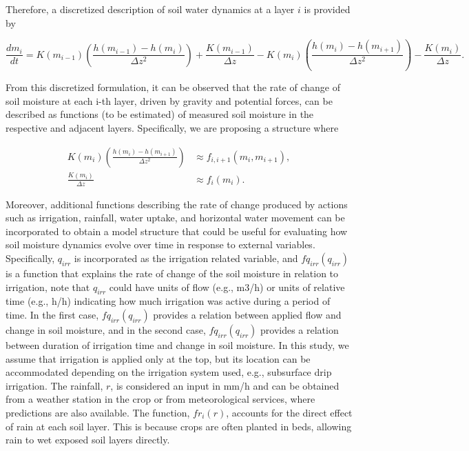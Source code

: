 \documentclass[pdflatex,sn-nature]{sn-jnl}%
\theoremstyle{thmstyleone}%
\theoremstyle{thmstyletwo}%
\theoremstyle{thmstylethree}%
\begin{document}
Therefore, a discretized description of soil water dynamics at a layer $i$ is provided by

\begin{equation}
\frac{d m_i}{d t} = K(m_{i-1})\left(\frac{h(m_{i-1})-h(m_{i})}{\Delta z^2}\right) + \frac{K(m_{i-1})}{\Delta z} - K(m_{i})\left(\frac{h(m_{i})-h(m_{i+1})}{\Delta z^2}\right) - \frac{K(m_{i})}{\Delta z}.
\end{equation}


From this discretized formulation, it can be observed that the rate of change of soil moisture at each i-th layer, driven by gravity and potential forces, can be described as functions (to be estimated) of measured soil moisture in the respective and adjacent layers. Specifically, we are proposing a structure where

\begin{equation}
\begin{aligned}
K(m_{i})\left(\frac{h(m_{i})-h(m_{i+1})}{\Delta z^2}\right) &\approx f_{i,i+1}({m}_i,{m}_{i+1}), \\ 
\frac{K(m_{i})}{\Delta z} &\approx f_i({m}_i).
\end{aligned}
\end{equation}



Moreover, additional functions describing the rate of change produced by actions such as irrigation, rainfall, water uptake, and horizontal water movement can be incorporated to obtain a model structure that could be useful for evaluating how soil moisture dynamics evolve over time in response to external variables. Specifically, $q_{irr}$ is incorporated as the irrigation related variable, and $fq_{irr}(q_{irr})$ is a function that explains the rate of change of the soil moisture in relation to irrigation, note that $q_{irr}$ could have units of flow (e.g., \si{m3/h}) or units of relative time (e.g., \si{h/h}) indicating how much irrigation was active during a period of time. In the first case, $fq_{irr}(q_{irr})$ provides a relation between applied flow and change in soil moisture, and in the second case, $fq_{irr}(q_{irr})$  provides a relation between duration of irrigation time and change in soil moisture. In this study, we assume that irrigation is applied only at the top, but its location can be accommodated depending on the irrigation system used, e.g., subsurface drip irrigation. 
The rainfall, $r$, is considered an input in \si{mm/h} and can be obtained from a weather station in the crop or from meteorological services, where predictions are also available. The function, $fr_i(r)$, accounts for the direct effect of rain at each soil layer. This is because crops are often planted in beds, allowing rain to wet exposed soil layers directly.
\end{document}
